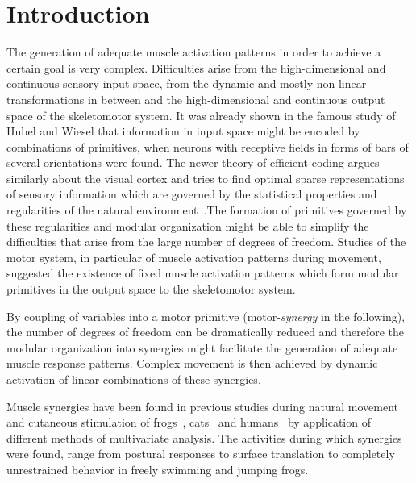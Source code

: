 \chapter{Introduction} %
\label{sg:cha:introduction}

The generation of adequate muscle activation patterns in order to achieve a certain goal is very complex. Difficulties arise from the high-dimensional and continuous sensory input space, from the dynamic and mostly non-linear transformations in between and the high-dimensional and continuous output space of the skeletomotor system. It was already shown in the famous study of Hubel and Wiesel \citet{Hubel:1959p3833} that information in input space might be encoded by combinations of primitives, when neurons with receptive fields in forms of bars of several orientations were found. The newer theory of efficient coding argues similarly about the visual cortex and tries to find optimal sparse representations of sensory information which are governed by the statistical properties and regularities of the natural environment~\citet{Olshausen:1996p3611}.The formation of primitives governed by these regularities and modular organization might be able to simplify the difficulties that arise from the large number of degrees of freedom. Studies of the motor system, in particular of muscle activation patterns during movement, suggested the existence of fixed muscle activation patterns which form modular primitives in the output space to the skeletomotor system. 

By coupling of variables into a motor primitive (motor-\emph{synergy} in the following), the number of degrees of freedom can be dramatically reduced and therefore the modular organization into synergies might facilitate the generation of adequate muscle response patterns. Complex movement is then achieved by dynamic activation of linear combinations of these synergies.

Muscle synergies have been found in previous studies during natural movement and cutaneous stimulation of frogs~\citet{Tresch:1999p3783,Hart:2004p3786,Davella:2003p3784,Cheung:2005p3778}, cats~\citet{Ting:2004p3785} and humans~\citet{Merkle:1998p3780,Weiss:2004p3782,Krishnamoorthy:2003p3787,Olree:1995p3781,Ivanenko:2003p3779} by application of different methods of multivariate analysis. The activities during which synergies were found, range from postural responses to surface translation to completely unrestrained behavior in freely swimming and jumping frogs.

